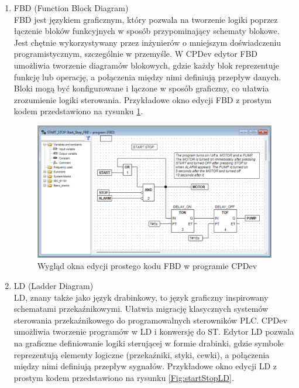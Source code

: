 \documentclass[12pt,twoside]{article}
\begin{document}
\begin{enumerate}[label=\alph*), leftmargin=1.25cm]
    \item FBD (Function Block Diagram)\\
    FBD jest językiem graficznym, który pozwala na tworzenie logiki poprzez łączenie bloków funkcyjnych w sposób przypominający schematy blokowe. Jest chętnie wykorzystywany przez inżynierów o mniejszym doświadczeniu programistycznym, szczególnie w przemyśle. W CPDev edytor FBD umożliwia tworzenie diagramów blokowych, gdzie każdy blok reprezentuje funkcję lub operację, a połączenia między nimi definiują przepływ danych. Bloki mogą być konfigurowane i łączone w sposób graficzny, co ułatwia zrozumienie logiki sterowania. Przykładowe okno edycji FBD z prostym kodem przedstawiono na rysunku \ref{Fig:startStopFBD}.

   \begin{figure}[ht]
   \centering
   \includegraphics[width=14cm]{images/startStopFBD.png}
   \caption{Wygląd okna edycji prostego kodu FBD w programie CPDev}
   \label{Fig:startStopFBD}
   \end{figure}

    \item LD (Ladder Diagram)\\
    LD, znany także jako język drabinkowy, to język graficzny inspirowany schematami przekaźnikowymi. Ułatwia migrację klasycznych systemów sterowania przekaźnikowego do programowalnych sterowników PLC. CPDev umożliwia tworzenie programów w LD i konwersję do ST. Edytor LD pozwala na graficzne definiowanie logiki sterującej w formie drabinki, gdzie symbole reprezentują elementy logiczne (przekaźniki, styki, cewki), a połączenia między nimi definiują przepływ sygnałów. Przykładowe okno edycji LD z prostym kodem przedstawiono na rysunku \ref{Fig:startStopLD}.


\end{enumerate}
\end{document}

